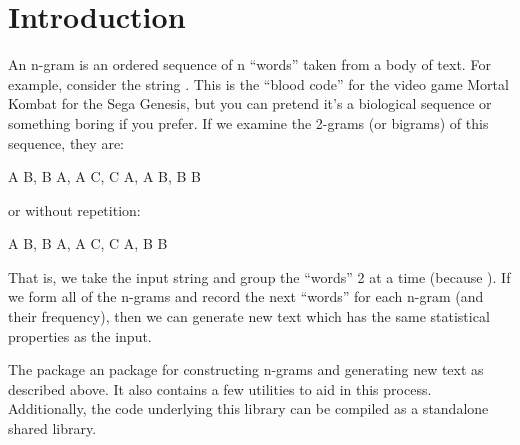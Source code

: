 \section{Introduction}
\label{sec:intro}

An n-gram is an ordered sequence of n ``words'' taken from a body of
text.  For example, consider the string . This is the 
``blood code'' for the video game Mortal Kombat for the Sega Genesis, but you 
can pretend it's a biological sequence or something boring if you prefer.  If we
examine the 2-grams (or bigrams) of this sequence, they are:
\\
\begin{Code}
A B, B A, A C, C A, A B, B B
\end{Code}
or without repetition:
\\
\begin{Code}
A B, B A, A C, C A, B B
\end{Code}

That is, we take the input string and group the ``words'' 2 at a time (because 
).  If we form all of the n-grams and record the next ``words'' for 
each n-gram (and their frequency), then we can generate new text which has the 
same statistical properties as the input.

The \thispackage package an \R package for constructing n-grams and generating 
new text as described above.  It also contains a few utilities to aid in this 
process.  Additionally, the \C code underlying this library can be compiled as 
a standalone shared library.